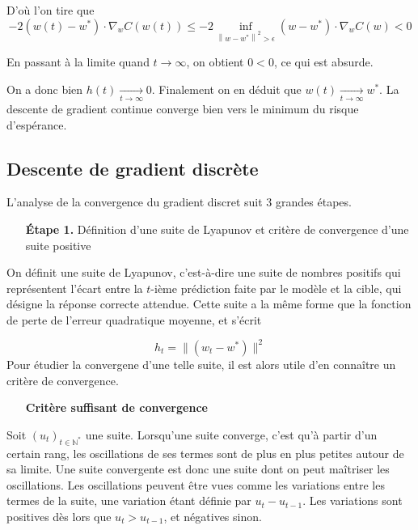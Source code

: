 \documentclass{article}
\begin{document}
D'où l'on tire que
\begin{equation*}
    -2(w(t)-w^{*}) \cdot \nabla_wC(w(t)) \leq -2\inf_{\left\|w-w^*\right\|^2>\epsilon} (w-w^{*}) \cdot \nabla_wC(w) < 0 
\end{equation*}

En passant à la limite quand $t\to\infty$, on obtient $0<0$, ce qui est absurde. 

On a donc bien $h(t)\underset{t\to\infty}\longrightarrow 0$. Finalement on en déduit que $w(t)\underset{t\to\infty}\longrightarrow w^*$. La descente de gradient continue converge bien vers le minimum du risque d'espérance.

\subsection{Descente de gradient discrète}

L'analyse de la convergence du gradient discret suit 3 grandes étapes.
\bigskip

\begin{itemize} %
  \item[\textbf{Étape 1.}] Définition d'une suite de Lyapunov et critère de convergence d'une suite positive
\end{itemize}
\bigskip

On définit une suite de Lyapunov, c'est-à-dire une suite de nombres positifs qui représentent l'écart entre la $t$-ième prédiction faite par le modèle et la cible, qui désigne la réponse correcte attendue. Cette suite a la même forme que la fonction de perte de l'erreur quadratique moyenne, et s'écrit 

\begin{equation*}
    h_t = \lVert(w_t - w^*)\rVert^2
\end{equation*}
Pour étudier la convergene d'une telle suite, il est alors utile d'en connaître un critère de convergence.
\bigskip
  
\begin{itemize}  
  \item[\textbf{Critère suffisant de convergence}]
\end{itemize}
\bigskip

Soit $(u_t)_{t \in\mathbb{N}^{*}}$ une suite. %
Lorsqu'une suite converge, c'est qu'à partir d'un certain rang, les oscillations de ses termes sont de plus en plus petites autour de sa limite. Une suite convergente est donc une suite dont on peut maîtriser les oscillations.
Les oscillations peuvent être vues comme les variations entre les termes de la suite, une variation étant définie par $u_t - u_{t-1}$. Les variations sont positives dès lors que $u_t > u_{t-1}$, et négatives sinon. 
\end{document}
